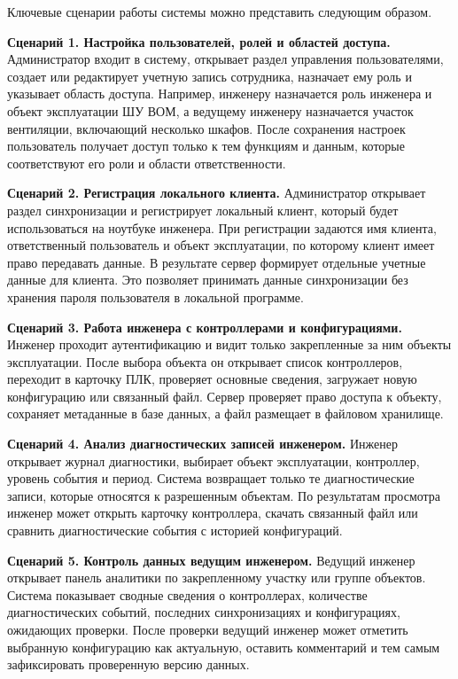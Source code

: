 Ключевые сценарии работы системы можно представить следующим образом.

\textbf{Сценарий 1. Настройка пользователей, ролей и областей доступа.} Администратор входит в систему, открывает раздел управления пользователями, создает или редактирует учетную запись сотрудника, назначает ему роль и указывает область доступа. Например, инженеру назначается роль инженера и объект эксплуатации ШУ ВОМ, а ведущему инженеру назначается участок вентиляции, включающий несколько шкафов. После сохранения настроек пользователь получает доступ только к тем функциям и данным, которые соответствуют его роли и области ответственности.

\textbf{Сценарий 2. Регистрация локального клиента.} Администратор открывает раздел синхронизации и регистрирует локальный клиент, который будет использоваться на ноутбуке инженера. При регистрации задаются имя клиента, ответственный пользователь и объект эксплуатации, по которому клиент имеет право передавать данные. В результате сервер формирует отдельные учетные данные для клиента. Это позволяет принимать данные синхронизации без хранения пароля пользователя в локальной программе.

\textbf{Сценарий 3. Работа инженера с контроллерами и конфигурациями.} Инженер проходит аутентификацию и видит только закрепленные за ним объекты эксплуатации. После выбора объекта он открывает список контроллеров, переходит в карточку ПЛК, проверяет основные сведения, загружает новую конфигурацию или связанный файл. Сервер проверяет право доступа к объекту, сохраняет метаданные в базе данных, а файл размещает в файловом хранилище.

\textbf{Сценарий 4. Анализ диагностических записей инженером.} Инженер открывает журнал диагностики, выбирает объект эксплуатации, контроллер, уровень события и период. Система возвращает только те диагностические записи, которые относятся к разрешенным объектам. По результатам просмотра инженер может открыть карточку контроллера, скачать связанный файл или сравнить диагностические события с историей конфигураций.

\textbf{Сценарий 5. Контроль данных ведущим инженером.} Ведущий инженер открывает панель аналитики по закрепленному участку или группе объектов. Система показывает сводные сведения о контроллерах, количестве диагностических событий, последних синхронизациях и конфигурациях, ожидающих проверки. После проверки ведущий инженер может отметить выбранную конфигурацию как актуальную, оставить комментарий и тем самым зафиксировать проверенную версию данных.

